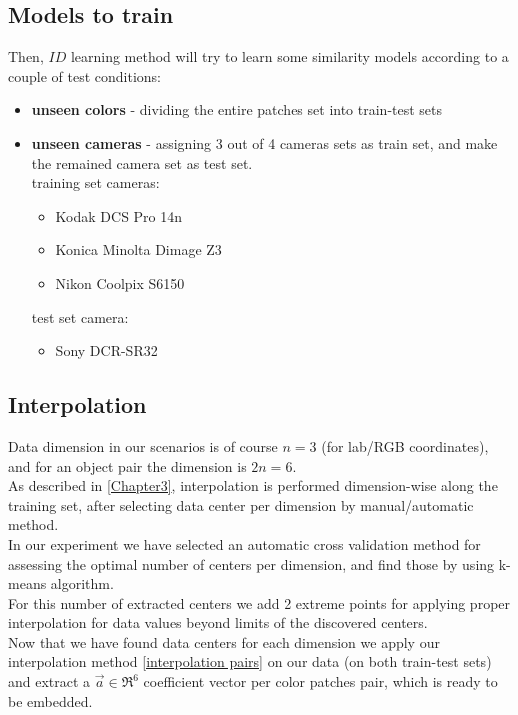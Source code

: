 \subsection{Models to train}
Then, $ID$ learning method will try to learn some similarity models according to a couple of test conditions:

\begin{itemize}
	\item \textbf{unseen colors} - dividing the entire patches set into train-test sets
	\item \textbf{unseen cameras} - assigning 3 out of 4 cameras sets as train set, and make the remained camera set as test set. \\
		training set cameras:
		\begin{itemize}
			\item Kodak DCS	Pro 14n
			\item Konica Minolta Dimage Z3
			\item Nikon Coolpix S6150
		\end{itemize}	
		
		test set camera:	
		\begin{itemize}
			\item Sony DCR-SR32
		\end{itemize}
		
\end{itemize}

\subsection{Interpolation}
Data dimension in our scenarios is of course $n=3$ (for lab/RGB \cite{RGB} coordinates), and for an object pair the dimension is $2n=6$. \\
As described in \ref{Chapter3}, interpolation is performed dimension-wise along the training set, after selecting data center per dimension by manual/automatic method.
\\
In our experiment we have selected an automatic cross validation \cite{cross validation} method for assessing the optimal number of centers per dimension, and find those by using k-means \cite{kmeans} algorithm.
\\
For this number of extracted centers we add 2 extreme points for applying proper interpolation for data values beyond limits of the discovered centers.
\\
Now that we have found data centers for each dimension we apply our interpolation method \ref{interpolation pairs} on our data (on both train-test sets) and extract a $\overrightarrow{a} \in \Re^6$ coefficient vector per color patches pair, which is ready to be embedded.


